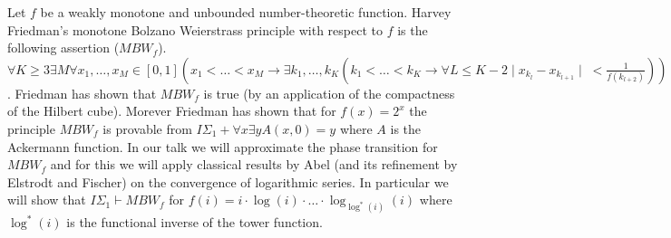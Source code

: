 \documentclass[bsl,meeting]{asl}
\newcommand{\NP}{}
\begin{document}
\thispagestyle{empty}


\NP  
{}

Let $f$ be a weakly monotone and unbounded number-theoretic function.
Harvey Friedman's monotone Bolzano Weierstrass principle with respect to $f$ is the following assertion ($MBW_f$). $\forall K\geq 3 \exists M \forall x_1,\ldots, x_M\in [0,1] (x_1<\ldots<x_M
\rightarrow \exists {k_1},\ldots, k_K (k_1<\ldots<k_K\rightarrow \forall L\leq K-2 \mid \!x_{k_l}-x_{k_{l+1}}\!\mid\; <\frac 1{f(k_{l+2})}))$. 
Friedman has shown that $MBW_f$ is true (by an application of the compactness of the Hilbert cube).
Morever Friedman has shown that for $f(x)=2^x$ the principle $MBW_f$ is provable
from $I\Sigma_1+\forall x \exists y A(x,0)=y$ where $A$ is the Ackermann function.
In our talk we will approximate the phase transition for $MBW_f$ and for this
we will apply classical results by Abel (and its refinement by Elstrodt and Fischer) on the convergence of logarithmic series.
In particular we will show that $I\Sigma_1\vdash MBW_f$ for 
$f(i)=i\cdot \log(i)\cdot\ldots\cdot  \log_{\log^*(i)}(i)$ where $\log^*(i)$ is the functional inverse of the tower function.


\begin{thebibliography}{10}


\end{thebibliography}


\vspace*{-0.5\baselineskip}
\end{document}
